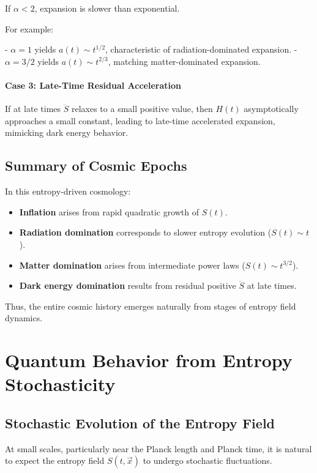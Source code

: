 \documentclass{article}
\begin{document}
If $\alpha < 2$, expansion is slower than exponential.

For example:

- $\alpha = 1$ yields $a(t) \sim t^{1/2}$, characteristic of radiation-dominated expansion.
- $\alpha = 3/2$ yields $a(t) \sim t^{2/3}$, matching matter-dominated expansion.

\paragraph{Case 3: Late-Time Residual Acceleration}

If at late times $\ddot{S}$ relaxes to a small positive value, then $H(t)$ asymptotically approaches a small constant, leading to late-time accelerated expansion, mimicking dark energy behavior.

\subsection{Summary of Cosmic Epochs}

In this entropy-driven cosmology:

\begin{itemize}
    \item \textbf{Inflation} arises from rapid quadratic growth of $S(t)$.
    \item \textbf{Radiation domination} corresponds to slower entropy evolution ($S(t) \sim t$).
    \item \textbf{Matter domination} arises from intermediate power laws ($S(t) \sim t^{3/2}$).
    \item \textbf{Dark energy domination} results from residual positive $\ddot{S}$ at late times.
\end{itemize}

Thus, the entire cosmic history emerges naturally from stages of entropy field dynamics.

\section{Quantum Behavior from Entropy Stochasticity}

\subsection{Stochastic Evolution of the Entropy Field}

At small scales, particularly near the Planck length and Planck time, it is natural to expect the entropy field $S(t, \vec{x})$ to undergo stochastic fluctuations.
\end{document}
